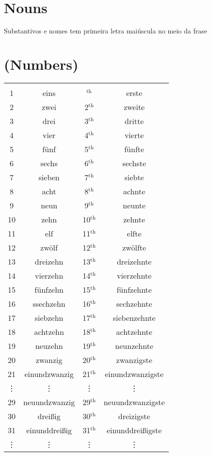 \section{{Nouns}}
Substantivos e nomes tem primeira letra maiúscula no meio da frase

\section{(Numbers)}
\begin{tabular}{cccc}
	& &&\\
	1&eins&$^{\text{th}}$&erste\\
	2&zwei&2$^{\text{th}}$&zweite\\
	3&drei&3$^{\text{th}}$&dritte\\
	4&vier&4$^{\text{th}}$&vierte\\
	5&fünf&5$^{\text{th}}$&fünfte\\
	6&sechs&6$^{\text{th}}$&sechste\\
	7&sieben&7$^{\text{th}}$&siebte\\
	8&acht&8$^{\text{th}}$&achnte\\
	9&neun&9$^{\text{th}}$&neunte\\
	10&zehn&10$^{\text{th}}$&zehnte\\
	11&elf&11$^{\text{th}}$&elfte\\
	12&zwölf&12$^{\text{th}}$&zwölfte\\
	13&dreizehn&13$^{\text{th}}$&dreizehnte\\
	14&vierzehn&14$^{\text{th}}$&vierzehnte\\
	15&fünfzehn&15$^{\text{th}}$&fünfzehnte\\
	16&ssechzehn&16$^{\text{th}}$&sechzehnte\\
	17&siebzehn&17$^{\text{th}}$&siebenzehnte\\
	18&achtzehn&18$^{\text{th}}$&achtzehnte\\
	19&neuzehn&19$^{\text{th}}$&neunzehnte\\
	20&zwanzig&20$^{\text{th}}$&zwanzigste\\
	21&einundzwanzig&21$^{\text{th}}$&einundzwanzigste\\
	\vdots&\vdots&\vdots&\vdots\\
	29&neuundzwanzig&29$^{\text{th}}$&neuundzwanzigste\\
	30&drei\ss ig&30$^{\text{th}}$&dreizigste\\
	31&einunddrei\ss ig&31$^{\text{th}}$&einunddrei\ss igste\\
	\vdots&\vdots&\vdots&\vdots\\

\end{tabular}
